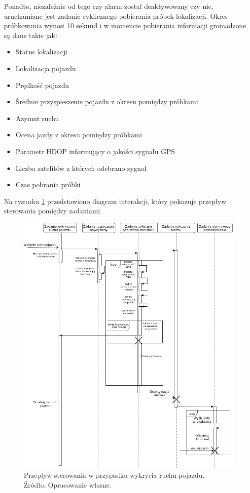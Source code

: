 Ponadto, niezależnie od tego czy alarm został deaktywowany czy nie, uruchamiane jest zadanie cyklicznego pobierania próbek lokalizacji. Okres próbkowania wynosi 10 sekund i w momencie pobierania informacji gromadzone są dane takie jak:

\begin{itemize}
\item Status lokalizacji
\item Lokalizacja pojazdu
\item Prędkość pojazdu
\item Średnie przyspieszenie pojazdu z okresu pomiędzy próbkami
\item Azymut ruchu
\item Ocena jazdy z okresu pomiędzy próbkami
\item Parametr HDOP informujący o jakości sygnału GPS
\item Liczba satelitów z których odebrano sygnał
\item Czas pobrania próbki
\end{itemize}

Na rysunku \ref{fig:image_soft_mainboard_control_flow} przedstawiono diagram interakcji, który pokazuje przepływ sterowania pomiędzy zadaniami. 


\begin{figure}[H]
	\centering
	\includegraphics[width=17cm]{img/software/mainboard/MainBoardStartTracking.jpg}
	\caption{Przepływ sterowania w przypadku wykrycia ruchu pojazdu. 
	\\Źródło: Opracowanie własne.}
	\label{fig:image_soft_mainboard_control_flow}
\end{figure}